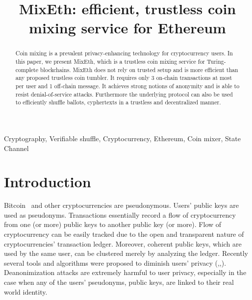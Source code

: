\documentclass[conference, compsoc]{IEEEtran}
\theoremstyle{definition}
\begin{document}
\title{MixEth: efficient, trustless coin mixing service for Ethereum}

\author{
\and
{}
}

\maketitle

\begin{abstract}
Coin mixing is a prevalent privacy-enhancing technology for cryptocurrency users.	
In this paper, we present MixEth, which is a trustless coin mixing service for Turing-complete blockchains. MixEth does not rely on trusted setup and is more efficient than any proposed trustless coin tumbler. It requires only 3 on-chain transactions at most per user and 1 off-chain message. It achieves strong notions of anonymity and is able to resist denial-of-service attacks. Furthermore the underlying protocol can also be used to efficiently shuffle ballots, cyphertexts in a trustless and decentralized manner.
\end{abstract}

\begin{IEEEkeywords}
Cryptography, Verifiable shuffle, Cryptocurrency, Ethereum, Coin mixer, State Channel
\end{IEEEkeywords}

\section{Introduction}
Bitcoin~\cite{nakamoto2008bitcoin} and other cryptocurrencies are pseudonymous. Users' public keys are used as pseudonyms. Transactions essentially record a flow of cryptocurrency from one (or more) public keys to another public key (or more). Flow of cryptocurrency can be easily tracked due to the open and transparent nature of cryptocurrencies' transaction ledger. Moreover, coherent public keys, which are used by the same user, can be clustered merely by analyzing the ledger. Recently several tools and algorithms were proposed to diminish users' privacy (\cite{meiklejohn2013fistful},\cite{moser2013inquiry},\cite{moreno2016listening}). Deanonimization attacks are extremely harmful to user privacy, especially in the case when any of the users' pseudonyms, public keys, are linked to their real world identity.
\end{document}
